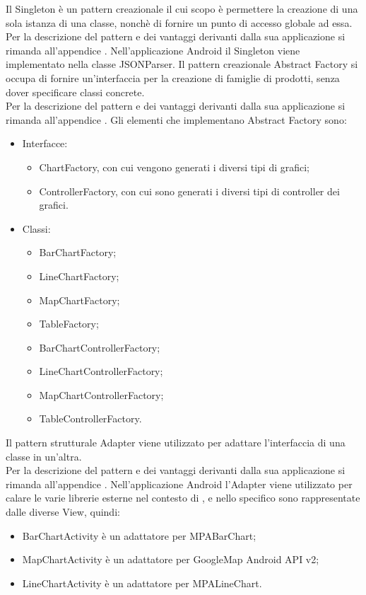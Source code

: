	Il Singleton è un pattern creazionale il cui scopo è permettere la creazione di una sola istanza di una classe, nonchè di fornire un punto di accesso globale ad essa.\\
	Per la descrizione del pattern e dei vantaggi derivanti dalla sua applicazione si rimanda all'appendice .
	Nell'applicazione Android il Singleton viene implementato nella classe JSONParser.
	Il pattern creazionale Abstract Factory si occupa di fornire un'interfaccia per la creazione di famiglie di prodotti, senza dover specificare classi concrete. \\
	Per la descrizione del pattern e dei vantaggi derivanti dalla sua applicazione si rimanda all'appendice .
	Gli elementi che implementano Abstract Factory sono:
	\begin{itemize}
	\item Interfacce:
		\begin{itemize}
			\item ChartFactory, con cui vengono generati i diversi tipi di grafici;
			\item ControllerFactory, con cui sono generati i diversi tipi di controller dei grafici.
		\end{itemize}
	\item Classi:
		\begin{itemize}
			\item BarChartFactory;
			\item LineChartFactory;
			\item MapChartFactory;
			\item TableFactory;
			\item BarChartControllerFactory;
			\item LineChartControllerFactory;
			\item MapChartControllerFactory;
			\item TableControllerFactory.
		\end{itemize}
	\end{itemize}
	Il pattern strutturale Adapter viene utilizzato per adattare l'interfaccia di una classe in un'altra.\\
	Per la descrizione del pattern e dei vantaggi derivanti dalla sua applicazione si rimanda all'appendice .
	Nell'applicazione Android l'Adapter viene utilizzato per calare le varie librerie esterne nel contesto di \projectname{}, e nello specifico sono rappresentate dalle diverse View, quindi:
	\begin{itemize}
	\item BarChartActivity è un adattatore per MPABarChart;
	\item MapChartActivity è un adattatore per GoogleMap Android API v2;
	\item LineChartActivity è un adattatore per MPALineChart.
	\end{itemize}
	
		
		
		
